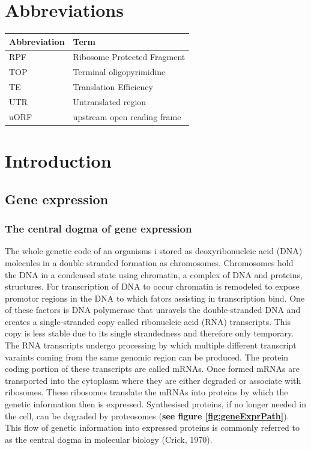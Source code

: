 \documentclass[12pt,openany]{book}
\author{}
\date{\vspace{-2.5em}}
\begin{document}
{
\setcounter{tocdepth}{3}
\tableofcontents
}
\cleardoublepage
\pagestyle{fancy} \fancyhf{} \renewcommand{\headrulewidth}{0pt}
\fancyfoot[LE,RO]{\thepage} \renewcommand{\floatpagefraction}{.9}
\setcounter{page}{9}

\chapter*{Abbreviations}\label{abbreviations}

\begin{tabular}{ll}
\toprule
Abbreviation & Term\\
\midrule
RPF & Ribosome Protected Fragment\\
TOP & Terminal oligopyrimidine\\
TE & Translation Efficiency\\
UTR & Untranslated region\\
uORF & upstream open reading frame\\
\bottomrule
\end{tabular}

\chapter{Introduction}

\section{Gene expression}\subsection{The central dogma of gene expression}

The whole genetic code of an organisms i stored as deoxyribonucleic acid
(DNA) molecules in a double stranded formation as chromosomes.
Chromosomes hold the DNA in a condensed state using chromatin, a complex
of DNA and proteins, structures. For transcription of DNA to occur
chromatin is remodeled to expose promotor regions in the DNA to which
fators assisting in transcription bind. One of these factors is DNA
polymerase that unravels the double-stranded DNA and creates a
single-stranded copy called ribonucleic acid (RNA) transcripts. This
copy is less stable due to its single strandedness and therefore only
temporary. The RNA transcripts undergo processing by which multiple
different transcript varaints coming from the same genomic region can be
produced. The protein coding portion of these transcripts are called
mRNAs. Once formed mRNAs are transported into the cytoplasm where they
are either degraded or associate with ribosomes. These ribosomes
translate the mRNAs into proteins by which the genetic information then
is expressed. Synthesised proteins, if no longer needed in the cell, can
be degraded by proteosomes (\textbf{see figure \ref{fig:geneExprPath}}).
This flow of genetic information into expressed proteins is commonly
referred to as the central dogma in molecular biology (Crick, 1970).
\clearpage
\end{document}
